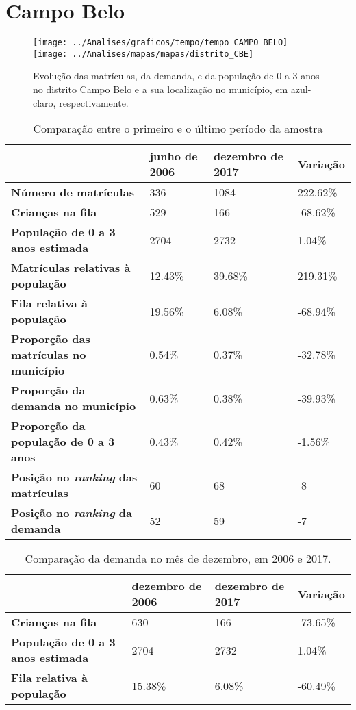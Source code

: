 \section{Campo Belo}
\begin{figure}[H]
\centering
\texttt{[image: ../Analises/graficos/tempo/tempo\_CAMPO\_BELO]}
\texttt{[image: ../Analises/mapas/mapas/distrito\_CBE]}
\caption{Evolução das matrículas, da demanda, e da população de 0 a 3 anos no distrito Campo Belo e a sua localização no município, em azul-claro, respectivamente.}
\end{figure}
\begin{table}[H]
\begin{tabular}{l|l|l|l}
\textbf{}                                      & \textbf{junho de 2006}       & \textbf{dezembro de 2017}    & \textbf{Variação} \\ \hline
\textbf{Número de matrículas}                  & 336 & 1084 & 222.62\% \\ \hline
\textbf{Crianças na fila}                      & 529 & 166 & -68.62\% \\ \hline
\textbf{População de 0 a 3 anos estimada}      & 2704 & 2732 & 1.04\% \\ \hline
\textbf{Matrículas relativas à população}      & 12.43\% & 39.68\% & 219.31\% \\ \hline
\textbf{Fila relativa à população}             & 19.56\% & 6.08\% & -68.94\% \\ \hline
\textbf{Proporção das matrículas no município} & 0.54\% & 0.37\% & -32.78\% \\ \hline
\textbf{Proporção da demanda no município}     & 0.63\% & 0.38\% & -39.93\% \\ \hline
\textbf{Proporção da população de 0 a 3 anos}  & 0.43\% & 0.42\% & -1.56\% \\ \hline
\textbf{Posição no \textit{ranking} das matrículas}     & 60 & 68 & -8 \\ \hline
\textbf{Posição no \textit{ranking} da demanda}         & 52 & 59 & -7 \\ 
\end{tabular}
\caption{Comparação entre o primeiro e o último período da amostra}
\end{table}
\begin{table}[H]
\begin{tabular}{l|l|l|l}
\textbf{}                                 & \textbf{dezembro de 2006} & \textbf{dezembro de 2017} & \textbf{Variação} \\ \hline
\textbf{Crianças na fila}                      & 630 & 166 & -73.65\% \\ \hline
\textbf{População de 0 a 3 anos estimada}      & 2704 & 2732 & 1.04\% \\ \hline
\textbf{Fila relativa à população}             & 15.38\% & 6.08\% & -60.49\% \\
\end{tabular}
\caption{Comparação da demanda no mês de dezembro, em 2006 e 2017.}
\end{table}
